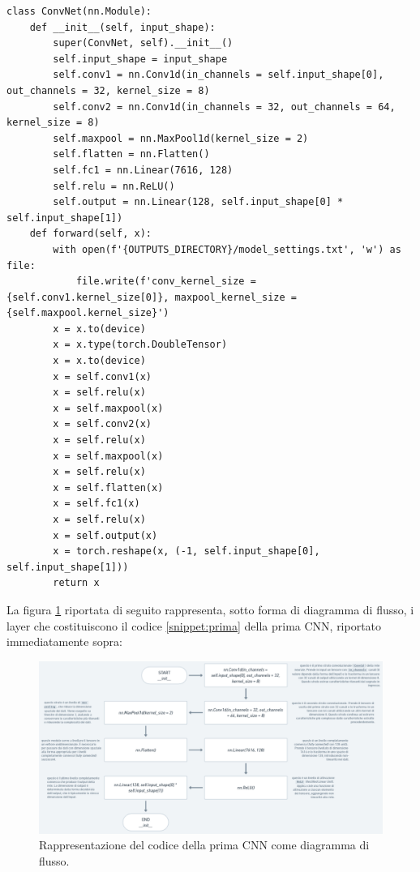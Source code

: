 \documentclass[12pt,italian]{report}
\begin{document}
	\lstset{language=Python}
	\begin{lstlisting}[aboveskip=15pt, belowskip=15pt, basicstyle=\fontsize{8}{10}\selectfont, keywordstyle=\color{blue}, breaklines=true, label=snippet:prima]
class ConvNet(nn.Module):
    def __init__(self, input_shape):
        super(ConvNet, self).__init__()
        self.input_shape = input_shape
        self.conv1 = nn.Conv1d(in_channels = self.input_shape[0], out_channels = 32, kernel_size = 8)
        self.conv2 = nn.Conv1d(in_channels = 32, out_channels = 64, kernel_size = 8)
        self.maxpool = nn.MaxPool1d(kernel_size = 2)
        self.flatten = nn.Flatten()
        self.fc1 = nn.Linear(7616, 128)
        self.relu = nn.ReLU()
        self.output = nn.Linear(128, self.input_shape[0] * self.input_shape[1])
    def forward(self, x):
        with open(f'{OUTPUTS_DIRECTORY}/model_settings.txt', 'w') as file:
            file.write(f'conv_kernel_size = {self.conv1.kernel_size[0]}, maxpool_kernel_size = {self.maxpool.kernel_size}')
        x = x.to(device)
        x = x.type(torch.DoubleTensor)
        x = x.to(device)
        x = self.conv1(x)
        x = self.relu(x)
        x = self.maxpool(x)
        x = self.conv2(x)
        x = self.relu(x)
        x = self.maxpool(x)
        x = self.relu(x)
        x = self.flatten(x)
        x = self.fc1(x)
        x = self.relu(x)
        x = self.output(x)
        x = torch.reshape(x, (-1, self.input_shape[0], self.input_shape[1]))
        return x
	\end{lstlisting}
	
	La figura \ref{fig:prima} riportata di seguito rappresenta, sotto forma di diagramma di flusso, i layer che costituiscono il codice \ref{snippet:prima} della prima CNN, riportato immediatamente sopra:
	
	\begin{figure}[H]
		\centering
		\includegraphics[width=1\textwidth]{immagini/prima.png}
		\captionsetup{justification=centering}
		\caption{Rappresentazione del codice della prima CNN come diagramma di flusso.}
		\label{fig:prima}
	\end{figure}
	
\end{document}
